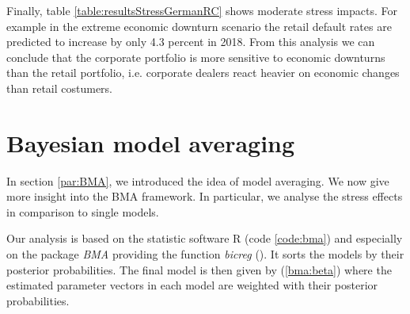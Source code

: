 \documentclass[a4paper, 11pt]{scrreprt}
\begin{document}
Finally, table \ref{table:resultsStressGermanRC} shows moderate stress impacts. For example in the extreme economic downturn scenario the retail default rates are predicted to increase by only 4.3 percent in 2018.
From this analysis we can conclude that the corporate portfolio is more sensitive to economic downturns than the retail portfolio, i.e. corporate dealers react heavier on economic changes than retail costumers. 


\section{Bayesian model averaging}\label{result:bma}

In section \ref{par:BMA}, we introduced the idea of model averaging. We now give more insight into the BMA framework. In particular, we analyse the stress effects in comparison to single models.

Our analysis is based on the statistic software R (code \ref{code:bma}) and especially on the package \textit{BMA} providing the function \textit{bicreg} (\textcite{raftery2017bma}). 
It sorts the models by their posterior probabilities. The final model is then given by (\ref{bma:beta}) where the estimated parameter vectors in each model are weighted with their posterior probabilities.
\end{document}
